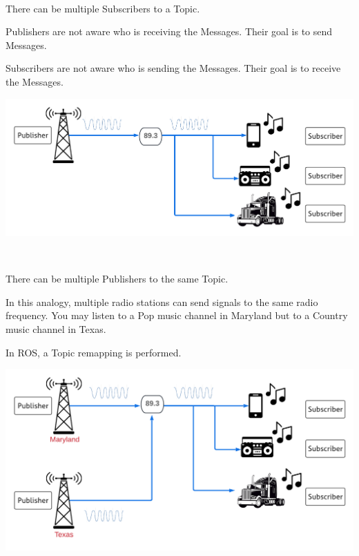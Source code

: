 \documentclass[usenames,11,dvipsnames,svgnames,x11names,aspectratio=1610,bibref]{beamer}
\newcommand{\mydisclaimer}{{\color{disclaimer}{\scriptsize ROS 2 -- Part I}}}
\newcommand{\iconColor}[1]{\textcolor{iconColor}{#1}}
\renewcommand\sec{{\cnordSix{\secname}\hfill\mydisclaimer~} }
\newcommand{\mynote}{\iconColor{\faEdit}\xspace}
\begin{document}
\begin{frame}[fragile]{\sec}
\vspace*{\fill}
\begin{center} 
There can be multiple Subscribers to a Topic. 

\begin{compactitem}
\footnotesize
\item Publishers are not aware who is receiving the Messages. Their goal is to send Messages.
\item Subscribers are not aware who is sending the Messages. Their goal is to receive the Messages.
\end{compactitem}

\includegraphics[width=.7\linewidth]{figures/lecture2/analogy6.pdf}

\end{center}
\vspace*{\fill}
\end{frame}

 
\begin{frame}[fragile]{\sec}
\vspace*{\fill}
\begin{center} 
There can be multiple Publishers to the same Topic. 

\begin{compactitem}
\footnotesize

\item In this analogy, multiple radio stations can send signals to the same radio frequency. You may listen to a Pop music channel in Maryland but to a Country music channel in Texas.
\item \mynote In ROS, a Topic remapping is performed.
\end{compactitem}

\includegraphics[width=.7\linewidth]{figures/lecture2/analogy7.pdf}

\end{center}
\vspace*{\fill}
\end{frame}
\end{document}
